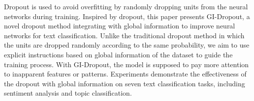 Dropout is used to avoid overfitting by randomly dropping units from the neural networks during training. Inspired by dropout, this paper presents GI-Dropout, a novel dropout method integrating with global information to improve neural networks for text classification. Unlike the traditional dropout method in which the units are dropped randomly according to the same probability, we aim to use explicit instructions based on global information of the dataset to guide the training process. With GI-Dropout, the model is supposed to pay more attention to inapparent features or patterns. Experiments demonstrate the effectiveness of the dropout with global information on seven text classification tasks, including sentiment analysis and topic classification.
